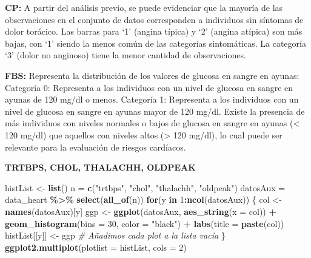 \documentclass[
]{article}
\newenvironment{Shaded}{\begin{snugshade}}{\end{snugshade}}
\newcommand{\AttributeTok}[1]{\textcolor[rgb]{0.13,0.29,0.53}{#1}}
\newcommand{\CommentTok}[1]{\textcolor[rgb]{0.56,0.35,0.01}{\textit{#1}}}
\newcommand{\ControlFlowTok}[1]{\textcolor[rgb]{0.13,0.29,0.53}{\textbf{#1}}}
\newcommand{\DecValTok}[1]{\textcolor[rgb]{0.00,0.00,0.81}{#1}}
\newcommand{\FunctionTok}[1]{\textcolor[rgb]{0.13,0.29,0.53}{\textbf{#1}}}
\newcommand{\NormalTok}[1]{#1}
\newcommand{\OtherTok}[1]{\textcolor[rgb]{0.56,0.35,0.01}{#1}}
\newcommand{\SpecialCharTok}[1]{\textcolor[rgb]{0.81,0.36,0.00}{\textbf{#1}}}
\newcommand{\StringTok}[1]{\textcolor[rgb]{0.31,0.60,0.02}{#1}}
\begin{document}
\textbf{CP:} A partir del análisis previo, se puede evidenciar que la
mayoría de las observaciones en el conjunto de datos corresponden a
individuos sin síntomas de dolor torácico. Las barras para `1' (angina
típica) y `2' (angina atípica) son más bajas, con `1' siendo la menos
común de las categorías sintomáticas. La categoría `3' (dolor no
anginoso) tiene la menor cantidad de observaciones.

\textbf{FBS:} Representa la distribución de los valores de glucosa en
sangre en ayunas: Categoría 0: Representa a los individuos con un nivel
de glucosa en sangre en ayunas de 120 mg/dl o menos. Categoría 1:
Representa a los individuos con un nivel de glucosa en sangre en ayunas
mayor de 120 mg/dl. Existe la presencia de más individuos con niveles
normales o bajos de glucosa en sangre en ayunas (\textless{} 120 mg/dl)
que aquellos con niveles altos (\textgreater{} 120 mg/dl), lo cual puede
ser relevante para la evaluación de riesgos cardíacos.

\textbf{TRTBPS, CHOL, THALACHH, OLDPEAK}

\begin{Shaded}
\begin{Highlighting}[]
\NormalTok{histList }\OtherTok{\textless{}{-}} \FunctionTok{list}\NormalTok{()}
\NormalTok{n }\OtherTok{=} \FunctionTok{c}\NormalTok{(}\StringTok{"trtbps"}\NormalTok{, }\StringTok{"chol"}\NormalTok{, }\StringTok{"thalachh"}\NormalTok{, }\StringTok{"oldpeak"}\NormalTok{)}
\NormalTok{datosAux }\OtherTok{=}\NormalTok{ data\_heart }\SpecialCharTok{\%\textgreater{}\%} \FunctionTok{select}\NormalTok{(}\FunctionTok{all\_of}\NormalTok{(n))}
\ControlFlowTok{for}\NormalTok{(y }\ControlFlowTok{in} \DecValTok{1}\SpecialCharTok{:}\FunctionTok{ncol}\NormalTok{(datosAux)) \{}
\NormalTok{  col }\OtherTok{\textless{}{-}} \FunctionTok{names}\NormalTok{(datosAux)[y]}
\NormalTok{  ggp }\OtherTok{\textless{}{-}} \FunctionTok{ggplot}\NormalTok{(datosAux, }\FunctionTok{aes\_string}\NormalTok{(}\AttributeTok{x =}\NormalTok{ col)) }\SpecialCharTok{+}
    \FunctionTok{geom\_histogram}\NormalTok{(}\AttributeTok{bins =} \DecValTok{30}\NormalTok{, }\AttributeTok{color =} \StringTok{"black"}\NormalTok{) }\SpecialCharTok{+}
    \FunctionTok{labs}\NormalTok{(}\AttributeTok{title =} \FunctionTok{paste}\NormalTok{(col))}
\NormalTok{  histList[[y]] }\OtherTok{\textless{}{-}}\NormalTok{ ggp }\CommentTok{\# Añadimos cada plot a la lista vacía}
\NormalTok{\}}
\FunctionTok{ggplot2.multiplot}\NormalTok{(}\AttributeTok{plotlist =}\NormalTok{ histList, }\AttributeTok{cols =} \DecValTok{2}\NormalTok{)}
\end{Highlighting}
\end{Shaded}
\end{document}
